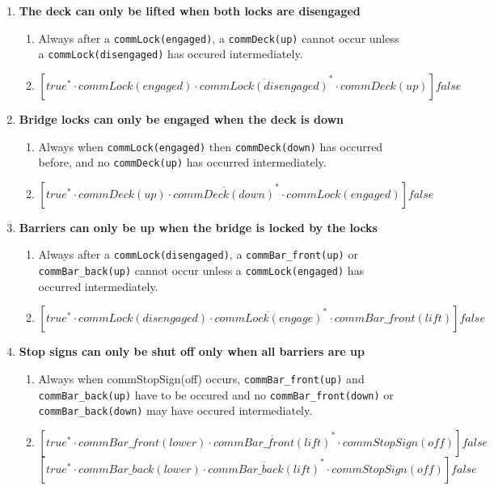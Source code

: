 \begin{enumerate}
	\item	\textbf{The deck can only be lifted when both locks are disengaged}
	\begin{enumerate}
		\item Always after a \texttt{commLock(engaged)}, a \texttt{commDeck(up)} cannot occur unless a \texttt{commLock(disengaged)} has occured intermediately.
		\item $[true^* \cdot commLock(engaged)\cdot \overline{commLock(disengaged)}^{*} \cdot commDeck(up)]false$\\
	\end{enumerate}

	\item \textbf{Bridge locks can only be engaged when the deck is down}
	\begin{enumerate}
		\item Always when \texttt{commLock(engaged)} then \texttt{commDeck(down)} has occurred before, and no \texttt{commDeck(up)} has occurred intermediately.
		\item $[true^* \cdot commDeck(up) \cdot \overline{commDeck(down)}^{*} \cdot commLock(engaged)]false$\\
	\end{enumerate}

	\item \textbf{Barriers can only be up when the bridge is locked by the locks}
	\begin{enumerate}
		\item Always after a \texttt{commLock(disengaged)}, a \texttt{commBar\_front(up)} or \texttt{commBar\_back(up)} cannot occur unless a \texttt{commLock(engaged)} has occurred intermediately.
		\item $[true^* \cdot commLock(disengaged)\cdot \overline{commLock(engage)}^{*} \cdot commBar\_front(lift)]false$\\
	\end{enumerate}

	\item \textbf{Stop signs can only be shut off only when all barriers are up}
	\begin{enumerate}
		\item Always when commStopSign(off) occurs, \texttt{commBar\_front(up)} and \texttt{commBar\_back(up)} have to be occured and no \texttt{commBar\_front(down)} or \texttt{commBar\_back(down)} may have occured intermediately.
		\item $[true^* \cdot commBar\_front(lower) \cdot \overline{commBar\_front(lift)}^{*} \cdot commStopSign(off)]false$
					$[true^* \cdot commBar\_back(lower) \cdot \overline{commBar\_back(lift)}^{*} \cdot commStopSign(off)]false$
	\end{enumerate}


\end{enumerate}
